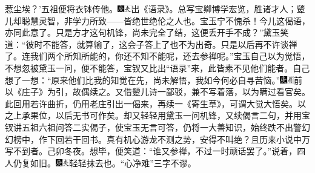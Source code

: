惹尘埃？'五祖便将衣钵传他。{\includegraphics[width=3mm]{../Images/00004}\includegraphics[width=3mm]{../Images/00012}\footnotesize \kaishu 出《语录》。总写宝卿博学宏览，胜诸才人；颦儿却聪慧灵智，非学力所致------皆绝世绝伦之人也。宝玉宁不愧杀！}今儿这偈语，亦同此意了。只是方才这句机锋，尚未完全了结，这便丢开手不成？''黛玉笑道：``彼时不能答，就算输了，这会子答上了也不为出奇。只是以后再不许谈禅了。连我们两个所知所能的，你还不知不能呢，还去参禅呢。''宝玉自己以为觉悟，不想忽被黛玉一问，便不能答，宝钗又比出``语录''来，此皆素不见他们能者。自己想了一想：``原来他们比我的知觉在先，尚未解悟，我如今何必自寻苦恼。''{\includegraphics[width=3mm]{../Images/00004}\includegraphics[width=3mm]{../Images/00010}\footnotesize \kaishu 前以《庄子》为引，故偶续之。又借颦儿诗一鄙驳，兼不写着落，以为瞒过看官矣。此回用若许曲折，仍用老庄引出一偈来，再续一《寄生草》，可谓大觉大悟矣。以之上承果位，以后无书可作矣。却又轻轻用黛玉一问机锋，又续偈言二句，并用宝钗讲五祖六祖问答二实偈子，使宝玉无言可答，仍将一大善知识，始终跌不出警幻幻榜中，作下回若干回书。真有机心游龙不测之势，安得不叫绝？且历来小说中万写不到者。己卯冬夜。}想毕，便笑道：``谁又参禅，不过一时顽话罢了。''说着，四人仍复如旧。{\includegraphics[width=3mm]{../Images/00004}\includegraphics[width=3mm]{../Images/00012}\footnotesize \kaishu 轻轻抹去也。``心净难''三字不谬。}

